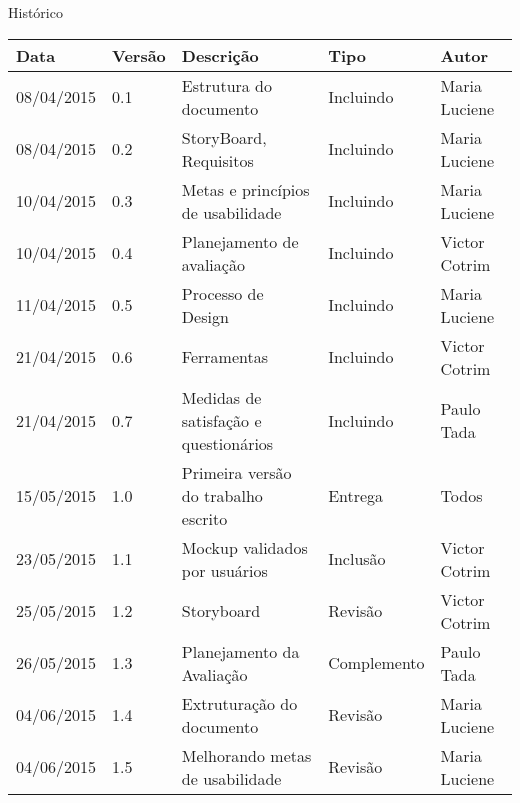 \begin{center}
	{\fontsize{1cm}{1em}\selectfont Histórico}
\end{center}

\begin{table}[h]
	\centering
	\begin{tabular}{|l|l|l|l|l|}
		\hline
		Data & Versão & Descrição & Tipo & Autor \\ \hline
		08/04/2015 & 0.1 & Estrutura do documento & Incluindo & Maria Luciene \\ \hline
		08/04/2015 & 0.2 & StoryBoard, Requisitos & Incluindo & Maria Luciene \\ \hline
		10/04/2015 & 0.3 & Metas e princípios de usabilidade & Incluindo & Maria Luciene \\ \hline
		10/04/2015 & 0.4 & Planejamento de avaliação & Incluindo & Victor Cotrim \\ \hline
		11/04/2015 & 0.5 & Processo de Design & Incluindo & Maria Luciene \\ \hline	
		21/04/2015 & 0.6 & Ferramentas & Incluindo & Victor Cotrim \\ \hline
		21/04/2015 & 0.7 & Medidas de satisfação e questionários & Incluindo & Paulo Tada \\ \hline
		15/05/2015 & 1.0 & Primeira versão do trabalho escrito & Entrega & Todos \\ \hline
		23/05/2015 & 1.1 & Mockup validados por usuários & Inclusão & Victor Cotrim \\ \hline
		25/05/2015 & 1.2 & Storyboard & Revisão & Victor Cotrim \\ \hline
		26/05/2015 & 1.3 & Planejamento da Avaliação & Complemento & Paulo Tada \\ \hline
		04/06/2015 & 1.4 & Extruturação do documento & Revisão & Maria Luciene \\ \hline
		04/06/2015 & 1.5 & Melhorando metas de usabilidade & Revisão & Maria Luciene \\ \hline


	\end{tabular}
\end{table}
